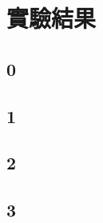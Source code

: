 \documentclass[UTF8, fontset=none]{ctexart}
\begin{document}
\section{實驗結果}
\subsection{0}
{\footnotesize
  
}

\subsection{1}
{\footnotesize
  
}

\subsection{2}
{\footnotesize
  
}

\subsection{3}
{\footnotesize
  
}
\end{document}
